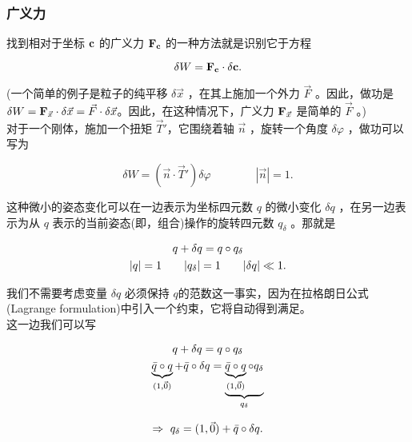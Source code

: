 \subsubsection{广义力}

找到相对于坐标 $\mathbf{c}$ 的广义力 $\mathbf{F_c}$ 的一种方法就是识别它于方程 

\begin{equation*}
\delta W = \mathbf{F_c} \cdot \delta \mathbf{c} .
\end{equation*}

(一个简单的例子是粒子的纯平移 $\delta \vec{x}$ ，在其上施加一个外力 $\vec{F}$ 。因此，做功是 $\delta W = \mathbf{F}_{\vec{x}} \cdot \delta \vec{x} = \vec{F} \cdot \delta \vec{x}$。因此，在这种情况下，广义力 $\mathbf{F}_{\vec{x}}$ 是简单的 $\vec{F}$ 。) \\

对于一个刚体，施加一个扭矩 $\vec{T}'$，它围绕着轴 $\vec{n}$ ，旋转一个角度 $\delta \varphi$ ，做功可以写为

\begin{equation}
\delta W = (\vec{n} \cdot \vec{T}') \delta \varphi  \qquad \qquad   |\vec{n}|=1.
\label{eqWTfi}
\end{equation}

这种微小的姿态变化可以在一边表示为坐标四元数 $q$ 的微小变化 $\delta q$ ，在另一边表示为从 $q$ 表示的当前姿态(即，组合)操作的旋转四元数 $q_\delta$ 。那就是

\begin{gather*}
q + \delta q = q \circ q_\delta    \\
|q|=1 \qquad   |q_\delta|=1  \qquad    |\delta q| \ll 1.
\end{gather*}

我们不需要考虑变量 $\delta q$ 必须保持 $q$的范数这一事实，因为在拉格朗日公式(Lagrange formulation)中引入一个约束，它将自动得到满足。\\

这一边我们可以写

\begin{gather*}
q + \delta q = q \circ q_\delta    \\
\underbrace{\bar{q} \circ q}_{(1,\vec{0})} + \bar{q} \circ \delta q = \underbrace{\underbrace{\bar{q} \circ q}_{(1,\vec{0})} \circ q_\delta}_{q_\delta}    
\end{gather*}

\begin{equation}
\Rightarrow \ q_\delta = (1,\vec{0}) + \bar{q} \circ \delta q.
\label{eq_qdelta}
\end{equation}

